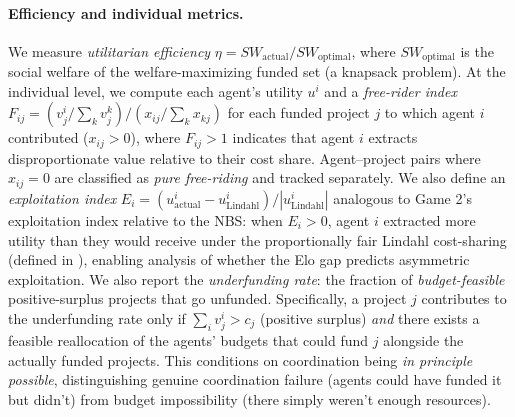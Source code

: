 \paragraph{Efficiency and individual metrics.}
We measure \emph{utilitarian efficiency} $\eta = SW_{\text{actual}} / SW_{\text{optimal}}$, where $SW_{\text{optimal}}$ is the social welfare of the welfare-maximizing funded set (a knapsack problem).
At the individual level, we compute each agent's utility $u^i$ and a \emph{free-rider index} $F_{ij} = (v^i_j / \sum_k v^k_j) / (x_{ij} / \sum_k x_{kj})$ for each funded project $j$ to which agent $i$ contributed ($x_{ij} > 0$), where $F_{ij} > 1$ indicates that agent $i$ extracts disproportionate value relative to their cost share.
Agent--project pairs where $x_{ij} = 0$ are classified as \emph{pure free-riding} and tracked separately.
We also define an \emph{exploitation index} $E_i = (u^i_{\text{actual}} - u^i_{\text{Lindahl}}) / |u^i_{\text{Lindahl}}|$ analogous to Game 2's exploitation index relative to the NBS: when $E_i > 0$, agent $i$ extracted more utility than they would receive under the proportionally fair Lindahl cost-sharing (defined in ), enabling analysis of whether the Elo gap predicts asymmetric exploitation.
We also report the \emph{underfunding rate}: the fraction of \emph{budget-feasible} positive-surplus projects that go unfunded.
Specifically, a project $j$ contributes to the underfunding rate only if $\sum_i v^i_j > c_j$ (positive surplus) \emph{and} there exists a feasible reallocation of the agents' budgets that could fund $j$ alongside the actually funded projects.
This conditions on coordination being \emph{in principle possible}, distinguishing genuine coordination failure (agents could have funded it but didn't) from budget impossibility (there simply weren't enough resources).

